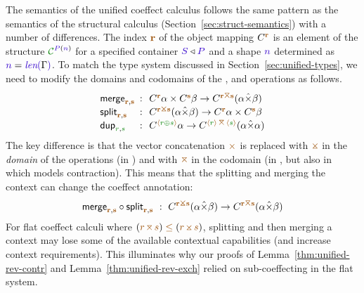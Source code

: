 The semantics of the unified coeffect calculus follows the same pattern as the semantics of the
structural calculus (Section~\ref{sec:struct-semantics}) with a number of differences. The 
index $\aclrd{\textbf{r}}$ of the object mapping $\ctyp{\aclrd{\textbf{r}}}$ is an element of 
the structure $\C^{\SP(\sclrd{n})}$ for a specified container $\SH \triangleleft \SP$ and a shape 
$\sclrd{n}$ determined as $\sclrd{n} = \slen{\Gamma}$. To match the type system discussed in 
Section~\ref{sec:unified-types}, we need to modify the domains and codomains of the , 
 and  operations as follows.
%
\begin{equation*}
\begin{array}{lcl}
 \ident{merge}_{\aclrd{\textbf{r}},\aclrd{\textbf{s}}} &\narrow{:}& 
  \ctyp{\aclrd{\textbf{r}}}{\alpha} \times \ctyp{\aclrd{\textbf{s}}}{\beta} \rightarrow \ctyp{\aclrd{\textbf{r}}\azip\aclrd{\textbf{s}}}{(\alpha \xtimes \beta)} \\
 \ident{split}_{\aclrd{\textbf{r}},\aclrd{\textbf{s}}} &\narrow{:}& 
  \ctyp{\aclrd{\textbf{r}}\apar\aclrd{\textbf{s}}}{(\alpha \xtimes \beta)} \rightarrow \ctyp{\aclrd{\textbf{r}}}{\alpha} \times \ctyp{\aclrd{\textbf{s}}}{\beta} \\
 \ident{dup}_{\cclrd{r}, \cclrd{s}} &\narrow{:}& 
  \ctyp{\alift{\cclrd{r} \cpar \cclrd{s}}}{\alpha} \rightarrow \ctyp{\alift{\cclrd{r}}\,\azip\,\alift{\cclrd{s}}}{(\alpha \xtimes \alpha)} \\
\end{array}
\end{equation*}
%
The key difference is that the vector concatenation $\atimes$ is replaced with $\apar$ in the
\emph{domain} of the operations (in ) and with $\azip$ in the codomain
(in , but also in  which models contraction).
This means that the splitting and merging the context can change the coeffect annotation:
%
\begin{equation*}
\ident{merge}_{\aclrd{\textbf{r}},\aclrd{\textbf{s}}} \circ \ident{split}_{\aclrd{\textbf{r}},\aclrd{\textbf{s}}} ~:~
  \ctyp{\aclrd{\textbf{r}}\apar\aclrd{\textbf{s}}}{(\alpha \xtimes \beta)}
  \rightarrow \ctyp{\aclrd{\textbf{r}}\azip\aclrd{\textbf{s}}}{(\alpha \xtimes \beta)} 
\end{equation*}
%
For flat coeffect calculi where $(\aclrd{r}\,\azip\,\aclrd{s}) \;\aclrd{\leq}\; (\aclrd{r}\,\apar\,\aclrd{s})$,
splitting and then merging a context may lose some of the available contextual capabilities
(and increase context requirements). This illuminates why our proofs of Lemma~\ref{thm:unified-rev-contr} 
and Lemma~\ref{thm:unified-rev-exch} relied on sub-coeffecting in the flat system.

